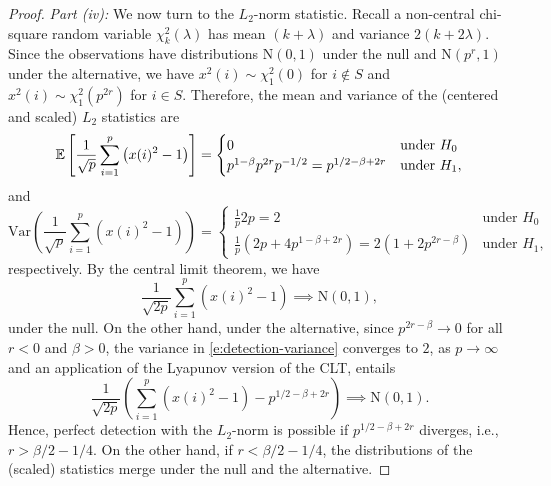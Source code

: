 \begin{proof}
{\em Part {\rm (iv)}:}  We now turn to the $L_2$-norm statistic.
Recall a non-central chi-square random variable $\chi^2_k(\lambda)$ has mean $(k+\lambda)$ and variance $2(k+2\lambda)$.
Since the observations have distributions $\mathrm{N}(0,1)$ under the null and $\mathrm{N}(p^r,1)$ under the alternative, we have $x^2(i)\sim \chi^2_1(0)$ for $i\not\in S$ and $x^2(i)\sim \chi^2_1(p^{2r})$ for $i\in S$.
Therefore, the mean and variance of the (centered and scaled) $L_2$ statistics are
\begin{equation}
    {\mathbb E}\left[\frac{1}{\sqrt{p}}\sum_{i=1}^p \left(x(i)^2-1\right)\right] = 
    \begin{cases}
    0 & \text{under } H_0\\
    p^{1-\beta}p^{2r}p^{-1/2} = p^{1/2-\beta+2r} & \text{under } H_1,
    \end{cases}
\end{equation}
and 
\begin{equation}\label{e:detection-variance}
    \mathrm{Var}\left(\frac{1}{\sqrt{p}}\sum_{i=1}^p \left(x(i)^2-1\right)\right) = 
    \begin{cases}
    \frac{1}{p}2p = 2 & \text{under } H_0\\
    \frac{1}{p}\left(2p+4p^{1-\beta+2r}\right) = 2(1+ 2p^{2r-\beta}) & \text{under } H_1,
    \end{cases}
\end{equation}
respectively.
By the central limit theorem, we have
\begin{equation}
    \frac{1}{\sqrt{2p}}\sum_{i=1}^p \left(x(i)^2-1\right) \implies \mathrm{N}(0,1),  
\end{equation}
under the null.    On the other hand, under the alternative, since $p^{2r-\beta}\to0$ for all $r<0$ and $\beta>0$, 
 the variance in \eqref{e:detection-variance} converges to $2$, as $p\to\infty$ and an application of the Lyapunov version of 
 the CLT, entails
 \begin{equation}
    \frac{1}{\sqrt{2p}}\left(\sum_{i=1}^p \left(x(i)^2-1\right) - p^{1/2-\beta+2r}\right) \implies \mathrm{N}(0,1).
\end{equation}
Hence, perfect detection with the $L_2$-norm is possible if $p^{1/2-\beta+2r}$ diverges, i.e., $r>\beta/2-1/4$.
On the other hand, if $r<\beta/2-1/4$, the distributions of the (scaled) statistics merge under the null and the alternative. %


\end{proof}
